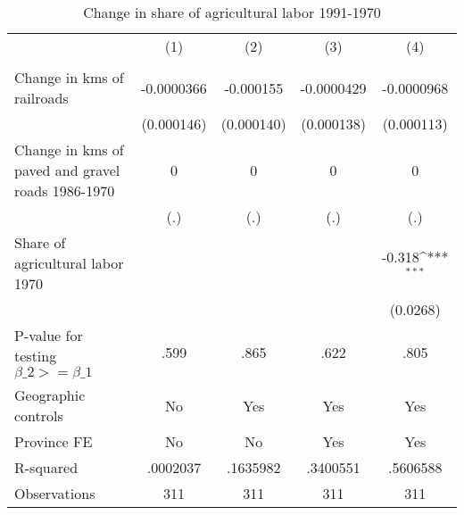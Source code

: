 \begin{table}[htbp]\centering
\def\sym#1{\ifmmode^{#1}\else\(^{#1}\)\fi}
\caption{Change in share of agricultural labor 1991-1970}
\begin{tabular}{l*{4}{c}}
\hline\hline
                &\multicolumn{1}{c}{(1)}&\multicolumn{1}{c}{(2)}&\multicolumn{1}{c}{(3)}&\multicolumn{1}{c}{(4)}\\
                &\multicolumn{1}{c}{}&\multicolumn{1}{c}{}&\multicolumn{1}{c}{}&\multicolumn{1}{c}{}\\
\hline
Change in kms of railroads&-0.0000366         &-0.000155         &-0.0000429         &-0.0000968         \\
                &(0.000146)         &(0.000140)         &(0.000138)         &(0.000113)         \\
[1em]
Change in kms of paved and gravel roads 1986-1970&        0         &        0         &        0         &        0         \\
                &      (.)         &      (.)         &      (.)         &      (.)         \\
[1em]
Share of agricultural labor 1970&                  &                  &                  &   -0.318\sym{***}\\
                &                  &                  &                  & (0.0268)         \\
\hline
P-value for testing $\beta\_{2} >= \beta\_{1}$&     .599         &     .865         &     .622         &     .805         \\
Geographic controls&       No         &      Yes         &      Yes         &      Yes         \\
Province FE     &       No         &       No         &      Yes         &      Yes         \\
R-squared       & .0002037         & .1635982         & .3400551         & .5606588         \\
Observations    &      311         &      311         &      311         &      311         \\
\hline\hline
\end{tabular}
\end{table}
